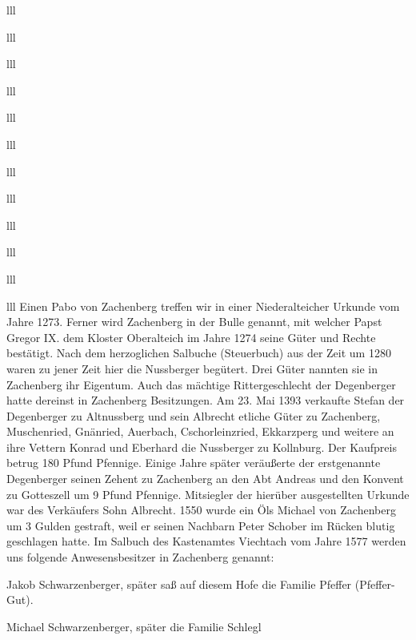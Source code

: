 \documentclass[12pt,a4pager]{book}
\begin{document}
\begin{tabuluar}{lll}
\begin{tabuluar}{lll}
\begin{tabuluar}{lll}
\begin{tabuluar}{lll}
\begin{tabuluar}{lll}
\begin{tabuluar}{lll}
\begin{tabuluar}{lll}
\begin{tabuluar}{lll}
\begin{tabuluar}{lll}
\begin{tabuluar}{lll}
\begin{tabuluar}{lll}
\begin{tabuluar}{lll}
Einen Pabo von Zachenberg treffen wir in einer Niederalteicher Urkunde vom Jahre
1273. Ferner wird Zachenberg in der Bulle genannt, mit welcher Papst Gregor IX.
dem Kloster Oberalteich im Jahre 1274 seine Güter und Rechte bestätigt. Nach dem
herzoglichen Salbuche (Steuerbuch) aus der Zeit um 1280 waren zu jener Zeit hier
die Nussberger begütert. Drei Güter nannten sie in Zachenberg ihr Eigentum. Auch
das mächtige Rittergeschlecht der Degenberger hatte dereinst in Zachenberg
Besitzungen. Am 23. Mai 1393 verkaufte Stefan der Degenberger zu Altnussberg und
sein Albrecht etliche Güter zu Zachenberg, Muschenried, Gnänried, Auerbach,
Cschorleinzried, Ekkarzperg und weitere an ihre Vettern Konrad und Eberhard die
Nussberger zu Kollnburg. Der Kaufpreis betrug 180 Pfund Pfennige. Einige Jahre
später veräußerte der erstgenannte Degenberger seinen Zehent zu Zachenberg an
den Abt Andreas und den Konvent zu Gotteszell um 9 Pfund Pfennige. Mitsiegler
der hierüber ausgestellten Urkunde war des Verkäufers Sohn Albrecht. 1550 wurde
ein Öls Michael von Zachenberg um 3 Gulden gestraft, weil er seinen Nachbarn
Peter Schober im Rücken blutig geschlagen hatte. Im Salbuch des Kastenamtes
Viechtach vom Jahre 1577 werden uns folgende Anwesensbesitzer in Zachenberg
genannt:

\begin{compactitem}
\item Jakob Schwarzenberger, später saß auf diesem Hofe die Familie Pfeffer
(Pfeffer-Gut).
\item Michael Schwarzenberger, später die Familie Schlegl
\end{compactitem}


\end{tabuluar}
\end{tabuluar}
\end{tabuluar}
\end{tabuluar}
\end{tabuluar}
\end{tabuluar}
\end{tabuluar}
\end{tabuluar}
\end{tabuluar}
\end{tabuluar}
\end{tabuluar}
\end{tabuluar}
\end{document}
